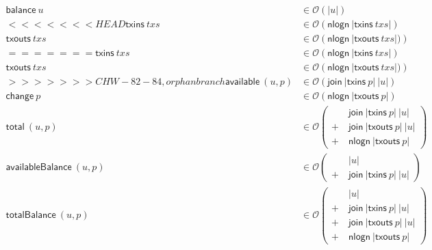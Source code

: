 \documentclass{article}
\newcommand{\order}[1]{\mathcal{O}\left(#1\right)}
\theoremstyle{definition}{
  \newtheorem{lemma}{Lemma}[section] %
  \newtheorem{definition}[lemma]{Definition}
}
\theoremstyle{theorem}{
  \newtheorem{invariant}[lemma]{Invariant}
  \newtheorem{proofobligation}[lemma]{Proof Obligation}
}
\numberwithin{equation}{lemma}
\begin{document}
\begin{figure}
\begin{figure}
\begin{equation*}
\begin{split}
\mathsf{balance} ~ u & \in \order{|u|} \\
<<<<<<< HEAD
\mathsf{txins}   ~ \mathit{txs}  & \in \order{\mathsf{nlogn} ~ |\mathsf{txins}~ \mathit{txs}|} \\
\mathsf{txouts}  ~ \mathit{txs}  & \in \order{\mathsf{nlogn} ~ |\mathsf{txouts}~ \mathit{txs}|)} \\
=======
\mathsf{txins}   ~ txs  & \in \order{\mathsf{nlogn} ~ |\mathsf{txins}~ txs|} \\
\mathsf{txouts}  ~ txs  & \in \order{\mathsf{nlogn} ~ |\mathsf{txouts}~ txs|)} \\
>>>>>>> CHW-82-84, orphan branch
\mathsf{available} ~ (u,p) & \in \order{\mathsf{join} ~ |\mathsf{txins}~ p| ~ |u|} \\
\mathsf{change}    ~ p     & \in \order{\mathsf{nlogn} ~ |\mathsf{txouts}~ p| } \\
\mathsf{total}     ~ (u,p) & \in \order{
                              \begin{split}
                                & ~ \mathsf{join} ~ |\mathsf{txins}~ p| ~ |u| \\
                              + & ~ \mathsf{join} ~ |\mathsf{txouts}~ p| ~ |u| \\
                              + & ~ \mathsf{nlogn} ~ |\mathsf{txouts}~ p|
                              \end{split}} \\
\mathsf{availableBalance} ~ (u,p) & \in \order{
                              \begin{split}
                                & ~ |u| \\
                              + & ~ \mathsf{join} ~ |\mathsf{txins}~ p| ~ |u|
                              \end{split}} \\
\mathsf{totalBalance}     ~ (u,p) & \in \order{
                              \begin{split}
                                & ~ |u| \\
                              + & ~ \mathsf{join} ~ |\mathsf{txins}~ p| ~ |u| \\
                              + & ~ \mathsf{join} ~ |\mathsf{txouts}~ p| ~ |u| \\
                              + & ~ \mathsf{nlogn} ~ |\mathsf{txouts}~ p|
                              \end{split}} \\

\end{split}
\end{equation*}
\end{figure}
\end{figure}
\end{document}
